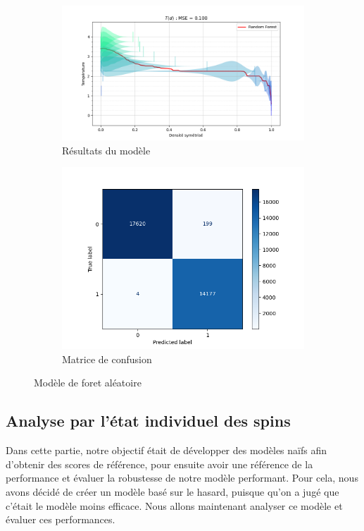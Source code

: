 \documentclass[11pt, parskip=half]{scrartcl} %
\begin{document}
\begin{figure}[h]
	\begin{subfigure}[c]{0.65\textwidth}
		\centering
		\includegraphics[width=1.1\linewidth]{./figures/forest.png}
		\caption{Résultats du modèle}
		\label{fig:forest}
	\end{subfigure}
	\begin{subfigure}[c]{0.3\textwidth}
		\centering
		\includegraphics[width=1.3\linewidth]{./figures/forest_matrix.png}
		\caption{Matrice de confusion}
		\label{fig:forest_matrix}
	\end{subfigure}
	\caption{Modèle de foret aléatoire}
\end{figure}

\subsection{Analyse par l'état individuel des spins}
Dans cette partie, notre objectif était de développer des modèles naïfs afin d’obtenir des scores de référence, pour ensuite avoir une référence de la performance et évaluer la robustesse de notre modèle performant. Pour cela, nous avons décidé de créer un modèle basé sur le hasard, puisque qu’on a jugé que c’était le modèle moins efficace. Nous allons maintenant analyser ce modèle et évaluer ces performances. 
\end{document}
